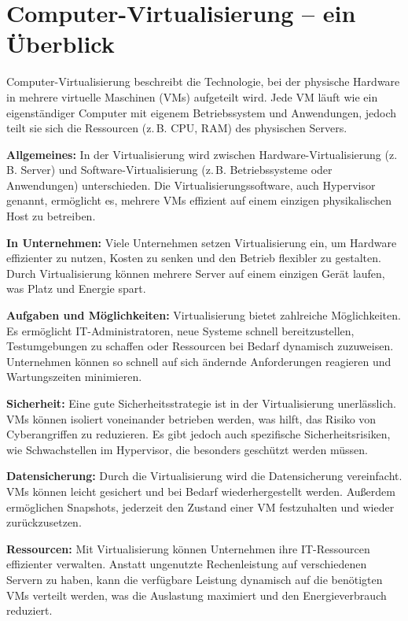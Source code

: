 \chapter{Computer-Virtualisierung -- ein Überblick}
\label{kap:ueberblick}


\begin{aufgabe}
Computer-Virtualisierung beschreibt die Technologie, bei der physische Hardware in mehrere virtuelle Maschinen (VMs) aufgeteilt wird. Jede VM läuft wie ein eigenständiger Computer mit eigenem Betriebssystem und Anwendungen, jedoch teilt sie sich die Ressourcen (z.\,B. CPU, RAM) des physischen Servers.

\textbf{Allgemeines:} In der Virtualisierung wird zwischen Hardware-Virtualisierung (z.\,B. Server) und Software-Virtualisierung (z.\,B. Betriebssysteme oder Anwendungen) unterschieden. Die Virtualisierungssoftware, auch Hypervisor genannt, ermöglicht es, mehrere VMs effizient auf einem einzigen physikalischen Host zu betreiben.

\textbf{In Unternehmen:} Viele Unternehmen setzen Virtualisierung ein, um Hardware effizienter zu nutzen, Kosten zu senken und den Betrieb flexibler zu gestalten. Durch Virtualisierung können mehrere Server auf einem einzigen Gerät laufen, was Platz und Energie spart.

\textbf{Aufgaben und Möglichkeiten:} Virtualisierung bietet zahlreiche Möglichkeiten. Es ermöglicht IT-Administratoren, neue Systeme schnell bereitzustellen, Testumgebungen zu schaffen oder Ressourcen bei Bedarf dynamisch zuzuweisen. Unternehmen können so schnell auf sich ändernde Anforderungen reagieren und Wartungszeiten minimieren.

\textbf{Sicherheit:} Eine gute Sicherheitsstrategie ist in der Virtualisierung unerlässlich. VMs können isoliert voneinander betrieben werden, was hilft, das Risiko von Cyberangriffen zu reduzieren. Es gibt jedoch auch spezifische Sicherheitsrisiken, wie Schwachstellen im Hypervisor, die besonders geschützt werden müssen.

\textbf{Datensicherung:} Durch die Virtualisierung wird die Datensicherung vereinfacht. VMs können leicht gesichert und bei Bedarf wiederhergestellt werden. Außerdem ermöglichen Snapshots, jederzeit den Zustand einer VM festzuhalten und wieder zurückzusetzen.

\textbf{Ressourcen:} Mit Virtualisierung können Unternehmen ihre IT-Ressourcen effizienter verwalten. Anstatt ungenutzte Rechenleistung auf verschiedenen Servern zu haben, kann die verfügbare Leistung dynamisch auf die benötigten VMs verteilt werden, was die Auslastung maximiert und den Energieverbrauch reduziert.
\end{aufgabe}
